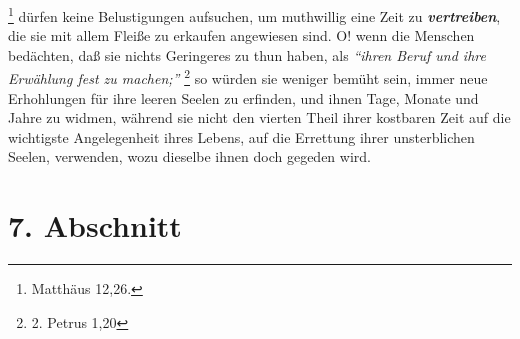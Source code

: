 \footnote{Matthäus 12,26.}
dürfen keine Belustigungen aufsuchen, um
muthwillig eine Zeit zu \textbf{\textit{vertreiben}}, die sie mit allem Fleiße zu erkaufen
angewiesen sind. O! wenn die Menschen bedächten, daß sie nichts Geringeres zu
thun haben, als
\textit{"`ihren Beruf und ihre Erwählung fest zu machen;"'}
\footnote{2. Petrus 1,20}
so würden sie weniger bemüht sein, immer neue Erhohlungen für ihre
leeren Seelen zu erfinden, und ihnen Tage, Monate und Jahre zu widmen, während
sie nicht den vierten Theil ihrer kostbaren Zeit auf die wichtigste
Angelegenheit ihres Lebens, auf die Errettung ihrer unsterblichen Seelen,
verwenden, wozu dieselbe ihnen doch gegeden wird.

\section{7. Abschnitt} \label{kap15_ab7}

